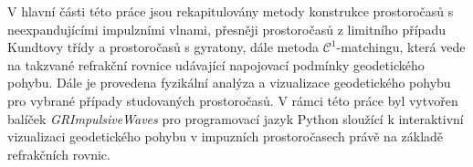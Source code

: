 \documentclass[12pt]{report}
\begin{document}

V hlavní části této práce jsou rekapitulovány metody konstrukce prostoročasů
s neexpandujícími impulzními vlnami, přesněji prostoročasů z limitního případu Kundtovy třídy a
prostoročasů s gyratony, dále metoda $\mathcal{C}^1$-matchingu, která vede na takzvané refrakční rovnice
udávající napojovací podmínky geodetického pohybu. Dále je provedena fyzikální analýza a vizualizace geodetického
pohybu pro vybrané případy studovaných prostoročasů.
V rámci této práce byl vytvořen balíček \emph{GRImpulsiveWaves} pro programovací jazyk Python sloužící k
interaktivní vizualizaci geodetického pohybu v impuzních prostoročasech právě na základě refrakčních rovnic.
\end{document}
